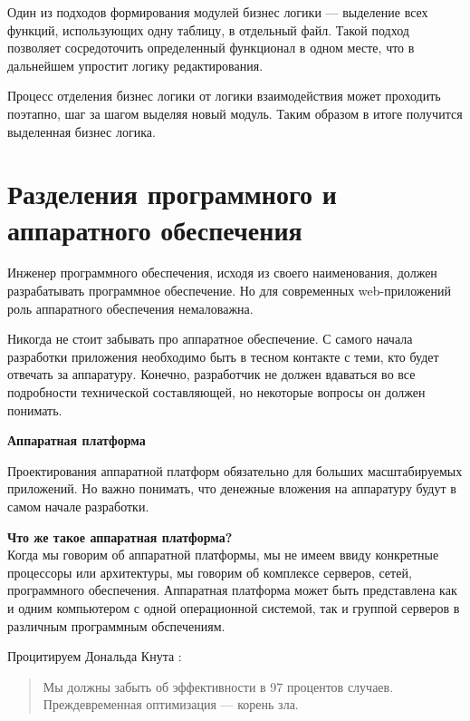 Один из подходов формирования модулей бизнес логики --- выделение всех функций, использующих одну таблицу, в отдельный файл. Такой подход позволяет сосредоточить определенный функционал в одном месте, что в дальнейшем упростит логику редактирования.

Процесс отделения бизнес логики от логики взаимодействия может проходить поэтапно, шаг за шагом выделяя новый модуль. Таким образом в итоге получится выделенная бизнес логика.


\section{ Разделения программного и аппаратного обеспечения } \label{sect1_5}

Инженер программного обеспечения, исходя из своего наименования, должен разрабатывать программное обеспечение. Но для современных web-приложений роль аппаратного обеспечения немаловажна.

Никогда не стоит забывать про аппаратное обеспечение. С самого начала разработки приложения необходимо быть в тесном контакте с теми, кто будет отвечать за аппаратуру. Конечно, разработчик не должен вдаваться во все подробности технической составляющей, но некоторые вопросы он должен понимать.


\textbf{ Аппаратная платформа } %

Проектирования аппаратной платформ обязательно для больших масштабируемых приложений. Но важно понимать, что денежные вложения на аппаратуру будут в самом начале разработки. 

\begin{center}
\begin{minipage}
{0.8\textwidth} 
\textbf{Что же такое аппаратная платформа?}\\
Когда мы говорим об аппаратной платформы, мы не имеем ввиду конкретные процессоры или архитектуры, мы говорим об комплексе серверов, сетей,  программного обеспечения. Аппаратная платформа может быть представлена как и одним компьютером с одной операционной системой, так и группой серверов в различным программным обспечениям.
\end{minipage}
\end{center}

Процитируем Дональда Кнута : 
\begin{flushleft}
\begin{verse}
Мы должны забыть об эффективности в 97 процентов случаев. Преждевременная оптимизация --- корень зла.
\end{verse}
\end{flushleft}

